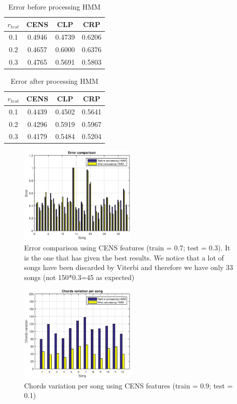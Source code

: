\begin{table}[h!]
	\caption{Error before processing HMM}
	\centering
	\begin{tabular}{|c |c c c|}
	\hline
	$r_{test}$ & CENS & CLP & CRP\\ \hline
	0.1 & 0.4946 & 0.4739 & 0.6206\\
	0.2 & 0.4657 & 0.6000 & 0.6376\\
	0.3 & 0.4765 & 0.5691 & 0.5803\\
	\hline
	\end{tabular}
	\label{tab:resultbeforeHMM}
\end{table}

\begin{table}[h!]
	\caption{Error after processing HMM}
	\centering
	\begin{tabular}{|c |c c c|}
	\hline
	$r_{test}$ & CENS & CLP & CRP\\ \hline
	0.1 & 0.4439 & 0.4502 & 0.5641\\
	0.2 & 0.4296 & 0.5919 & 0.5967\\
	0.3 & 0.4179 & 0.5484 & 0.5204\\
	\hline
	\end{tabular}
	\label{tab:resultafterHMM}
\end{table}

\begin{figure} [h!]
	\includegraphics[width=0.5\textwidth]{img/Result_HMM/CENS/plot03071}
	\caption{Error comparison using CENS features (train = 0.7; test = 0.3). It is the one that has given the best results. We notice that a lot of songs have been discarded by Viterbi and therefore we have only 33 songs (not 150*0.3=45 as expected)}
\end{figure}

\begin{figure} [h!]
	\includegraphics[width=0.5\textwidth]{img/Result_HMM/SMOOTHING/SmoothPerSongCENS0109}
	\caption{Chords variation per song using CENS features (train = 0.9; test = 0.1)}
\end{figure}


